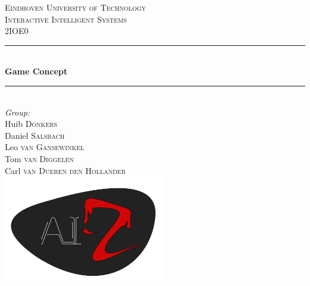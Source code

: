 \documentclass[12pt]{report}
\begin{document}
\begin{titlepage}

\newcommand{\HRule}{\rule{\linewidth}{0.5mm}} %

\center %
 

\textsc{\LARGE Eindhoven University of Technology}\\[1.5cm] %
\textsc{\Large Interactive Intelligent Systems}\\[0.5cm] %
\textsc{\large 2IOE0}\\[0.5cm] %


\HRule \\[0.4cm]
{ \huge \bfseries Game Concept}\\[0.4cm] %
\HRule \\[1.5cm]
 

\Large \emph{Group:}\\
Huib \textsc{Donkers}\\ %
Daniel \textsc{Salsbach}\\ %
Leo \textsc{van Gansewinkel}\\ %
Tom \textsc{van Diggelen}\\ %
Carl \textsc{van Dueren den Hollander}\\[.25cm] %


\includegraphics[width=7cm]{../AIZlogo.png}\\[.25cm] %
 

\end{titlepage}
\end{document}
